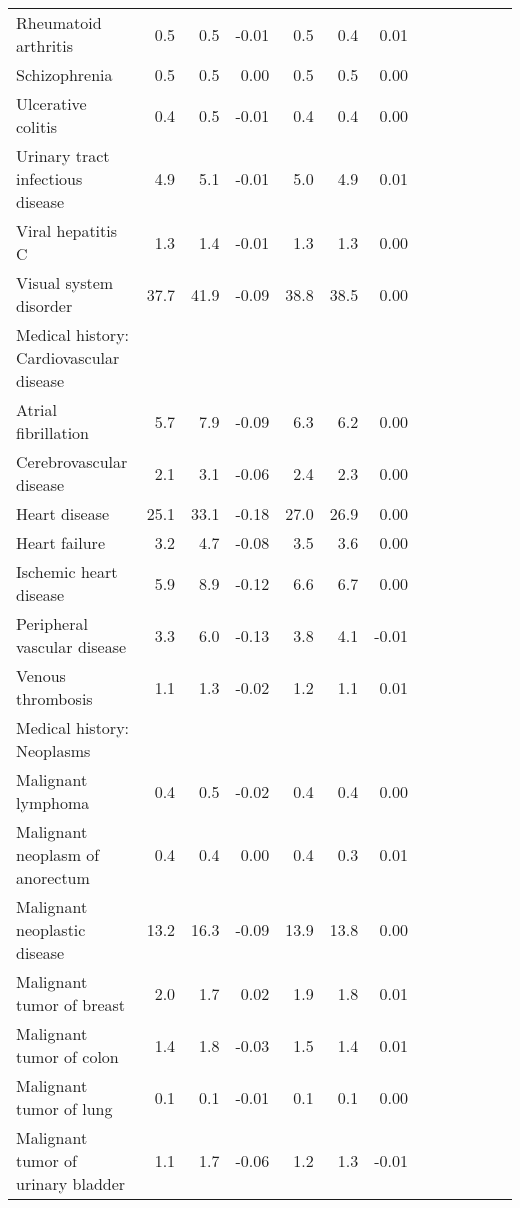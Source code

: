 \documentclass[11pt,]{article}
\begin{document}
\begin{longtable}{lrrrrrrrrrrrr}
      Rheumatoid arthritis &  0.5 &   0.5 & -0.01 &  0.5 &   0.4 &  0.01 \\ 
      Schizophrenia &  0.5 &   0.5 &  0.00 &  0.5 &   0.5 &  0.00 \\ 
      Ulcerative colitis &  0.4 &   0.5 & -0.01 &  0.4 &   0.4 &  0.00 \\ 
      Urinary tract infectious disease &  4.9 &   5.1 & -0.01 &  5.0 &   4.9 &  0.01 \\ 
      Viral hepatitis C &  1.3 &   1.4 & -0.01 &  1.3 &   1.3 &  0.00 \\ 
      Visual system disorder & 37.7 &  41.9 & -0.09 & 38.8 &  38.5 &  0.00 \\ 
  Medical history: Cardiovascular disease &    &     &     &    &     &     \\ 
      Atrial fibrillation &  5.7 &   7.9 & -0.09 &  6.3 &   6.2 &  0.00 \\ 
      Cerebrovascular disease &  2.1 &   3.1 & -0.06 &  2.4 &   2.3 &  0.00 \\ 
      Heart disease & 25.1 &  33.1 & -0.18 & 27.0 &  26.9 &  0.00 \\ 
      Heart failure &  3.2 &   4.7 & -0.08 &  3.5 &   3.6 &  0.00 \\ 
      Ischemic heart disease &  5.9 &   8.9 & -0.12 &  6.6 &   6.7 &  0.00 \\ 
      Peripheral vascular disease &  3.3 &   6.0 & -0.13 &  3.8 &   4.1 & -0.01 \\ 
      Venous thrombosis &  1.1 &   1.3 & -0.02 &  1.2 &   1.1 &  0.01 \\ 
  Medical history: Neoplasms &    &     &     &    &     &     \\ 
      Malignant lymphoma &  0.4 &   0.5 & -0.02 &  0.4 &   0.4 &  0.00 \\ 
      Malignant neoplasm of anorectum &  0.4 &   0.4 &  0.00 &  0.4 &   0.3 &  0.01 \\ 
      Malignant neoplastic disease & 13.2 &  16.3 & -0.09 & 13.9 &  13.8 &  0.00 \\ 
      Malignant tumor of breast &  2.0 &   1.7 &  0.02 &  1.9 &   1.8 &  0.01 \\ 
      Malignant tumor of colon &  1.4 &   1.8 & -0.03 &  1.5 &   1.4 &  0.01 \\ 
      Malignant tumor of lung &  0.1 &   0.1 & -0.01 &  0.1 &   0.1 &  0.00 \\ 
      Malignant tumor of urinary bladder &  1.1 &   1.7 & -0.06 &  1.2 &   1.3 & -0.01 \\ 

\end{longtable}
\end{document}
